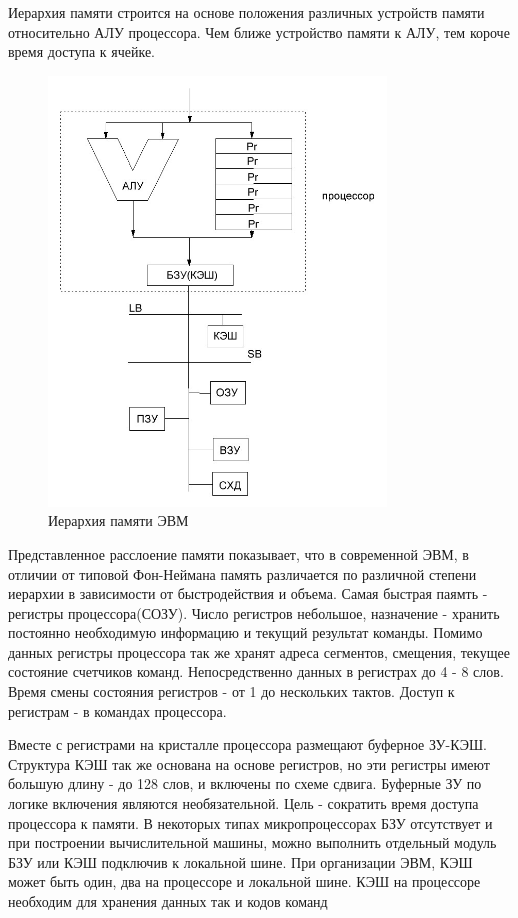 \documentclass[unicode, 12pt, a4paper, oneside]{article}
\begin{document}
Иерархия памяти строится на основе положения различных устройств памяти относительно АЛУ процессора. Чем ближе устройство памяти к АЛУ, тем короче время доступа к ячейке.

\begin{figure}[H]
\centering
\includegraphics[width=0.8\textwidth]{113_struct.JPG}
\caption{Иерархия памяти ЭВМ}
\end{figure}

Представленное расслоение памяти показывает, что в современной ЭВМ, в отличии от типовой Фон-Неймана память различается по различной степени иерархии в зависимости от быстродействия и объема. Самая быстрая паямть - регистры процессора(СОЗУ). Число регистров небольшое, назначение - хранить постоянно необходимую информацию и текущий результат команды. Помимо данных регистры процессора так же хранят адреса сегментов, смещения, текущее состояние счетчиков команд. Непосредственно данных в регистрах до 4 - 8 слов. Время смены состояния регистров - от 1 до нескольких тактов. Доступ к регистрам - в командах процессора.

Вместе с регистрами на кристалле процессора размещают буферное ЗУ-КЭШ. Структура КЭШ так же основана на основе регистров, но эти регистры имеют большую длину - до 128 слов, и включены по схеме сдвига. Буферные ЗУ по логике включения являются необязательной. Цель - сократить время доступа процессора к памяти. В некоторых типах микропроцессорах БЗУ отсутствует и при построении вычислительной машины, можно выполнить отдельный модуль БЗУ или КЭШ подключив к локальной шине. При организации ЭВМ, КЭШ может быть один, два на процессоре и локальной шине. КЭШ на процессоре необходим для хранения данных так и кодов команд
\end{document}
